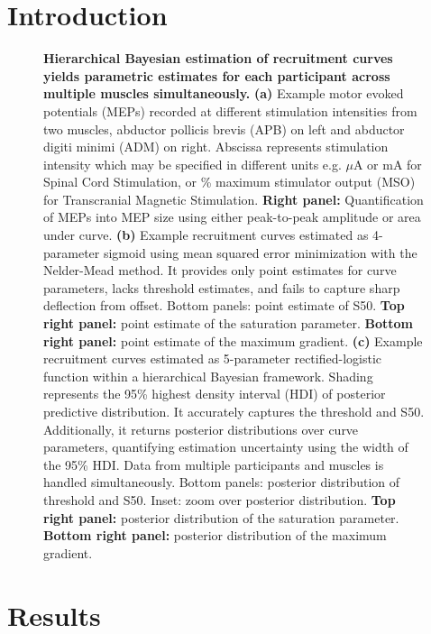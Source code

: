 \documentclass[pdflatex,sn-mathphys-ay]{sn-jnl}%
\numberwithin{equation}{subsection}
\theoremstyle{thmstyleone}%
\theoremstyle{thmstyletwo}%
\theoremstyle{thmstylethree}%
\begin{document}
\section{Introduction}\label{intro}

\begin{figure}[h]
    \centering
    \caption{\textbf{Hierarchical Bayesian estimation of recruitment curves yields parametric estimates for each participant across multiple muscles simultaneously.}  \textbf{(a)} Example motor evoked potentials (MEPs) recorded at different stimulation intensities from two muscles, abductor pollicis brevis (APB) on left and abductor digiti minimi (ADM) on right. Abscissa represents stimulation intensity which may be specified in different units e.g. $\mu$A or mA for Spinal Cord Stimulation, or \% maximum stimulator output (MSO) for Transcranial Magnetic Stimulation. \textbf{Right panel:} Quantification of MEPs into MEP size using either peak-to-peak amplitude or area under curve. \textbf{(b)} Example recruitment curves estimated as 4-parameter sigmoid using mean squared error minimization with the Nelder-Mead method. It provides only point estimates for curve parameters, lacks threshold estimates, and fails to capture sharp deflection from offset. Bottom panels: point estimate of S50. \textbf{Top right panel:} point estimate of the saturation parameter. \textbf{Bottom right panel:} point estimate of the maximum gradient. \textbf{(c)} Example recruitment curves estimated as 5-parameter rectified-logistic function within a hierarchical Bayesian framework. Shading represents the 95\% highest density interval (HDI) of posterior predictive distribution. It accurately captures the threshold and S50. Additionally, it returns posterior distributions over curve parameters, quantifying estimation uncertainty using the width of the 95\% HDI. Data from multiple participants and muscles is handled simultaneously. Bottom panels: posterior distribution of threshold and S50. Inset: zoom over posterior distribution. \textbf{Top right panel:} posterior distribution of the saturation parameter. \textbf{Bottom right panel:} posterior distribution of the maximum gradient.}\label{fig-intro}
\end{figure}

\section{Results}\label{results}
\end{document}
